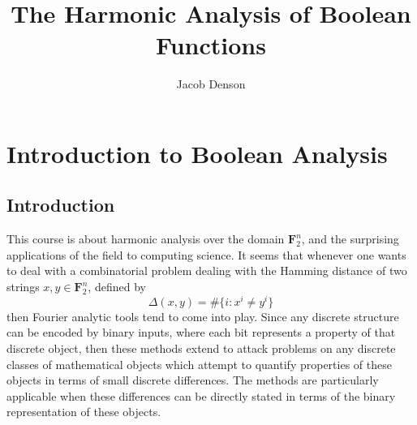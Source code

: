 

\title{The Harmonic Analysis of Boolean Functions}
\author{Jacob Denson}




\maketitle

\tableofcontents


\chapter{Introduction to Boolean Analysis}

\section{Introduction}

This course is about harmonic analysis over the domain $\mathbf{F}_2^n$, and the surprising applications of the field to computing science. It seems that whenever one wants to deal with a combinatorial problem dealing with the Hamming distance of two strings $x, y \in \mathbf{F}_2^n$, defined by
%
\[ \Delta(x,y) = \# \{ i : x^i \neq y^i \} \]
%
then Fourier analytic tools tend to come into play. Since any discrete structure can be encoded by binary inputs, where each bit represents a property of that discrete object, then these methods extend to attack problems on any discrete classes of mathematical objects which attempt to quantify properties of these objects in terms of small discrete differences. The methods are particularly applicable when these differences can be directly stated in terms of the binary representation of these objects.

